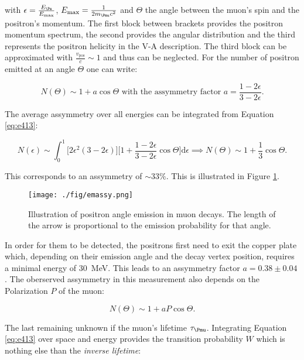 with $\epsilon = \frac{E_{\Pe}}{E_{\text{max}}}$, $E_{\text{max}} = \frac{1}{2m_{\Pmu}c^2}$ and $\Theta$ the angle between the muon's spin and the positron's momentum. The first block between brackets provides the positron momentum spectrum, the second provides the angular distribution and the third represents the positron helicity in the V-A description. The third block can be approximated with $\frac{v_{\text{pos}}}{c} \sim 1$ and thus can be neglected. For the number of positron emitted at an angle $\Theta$ one can write:

\begin{equation}
N(\Theta)\sim 1+ a\cos{\Theta} \text{ with the assymmetry factor } a=\frac{1-2\epsilon}{3-2\epsilon}.
\end{equation}

The average assymmetry over all energies can be integrated from Equation \ref{eq:e413}:

\begin{equation}
N(\epsilon) \sim \int_0^1 \big[2\epsilon^2(3-2\epsilon) \big] \Bigg[1+\frac{1-2\epsilon}{3-2\epsilon} \cos{\Theta} \Bigg] \mathrm{d}\epsilon \implies N(\Theta)\sim 1 + \frac{1}{3}\cos{\Theta}.
\end{equation}

This corresponds to an assymmetry of $\sim 33\%$. This is illustrated in Figure \ref{fig:emassy}.

\begin{figure}[htbp]
\centering
\texttt{[image: ./fig/emassy.png]}
\caption{Illustration of positron angle emission in muon decays. The length of the arrow is proportional to the emission probability for that angle.}
\label{fig:emassy}
\end{figure}

In order for them to be detected, the positrons first need to exit the copper plate which, depending on their emission angle and the decay vertex position, requires a minimal energy of \SI{30}{\mega\electronvolt}. This leads to an assymmetry factor $a=0.38\pm0.04$ \cite{Heel}. The oberserved assymmetry in this measurement also depends on the Polarization $P$ of the muon:

\begin{equation}
\label{eq:larg}
N(\Theta)\sim1+aP\cos{\Theta}.
\end{equation}

The last remaining unknown if the muon's lifetime $\tau_{\Pmu}$. Integrating Equation \ref{eq:e413} over space and energy provides the transition probability $W$ which is nothing else than the \textit{inverse lifetime}:

